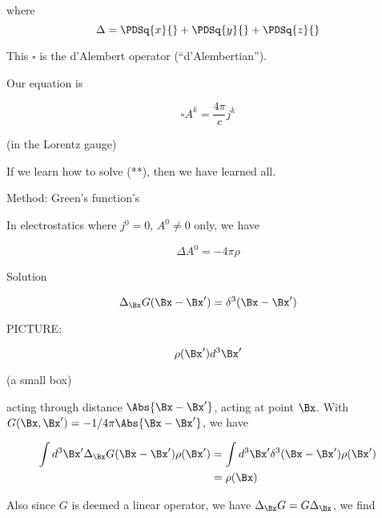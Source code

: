 where
\begin{equation}\label{eqn:relativisticElectrodynamicsL17b:291}
\Delta = \PDSq{x}{} + \PDSq{y}{} + \PDSq{z}{}
\end{equation}

This \(\square\) is the d'Alembert operator (``d'Alembertian'').

Our equation is 

\begin{equation}\label{eqn:relativisticElectrodynamicsL17b:310}
\square A^k = \frac{4 \pi}{c} j^k
\end{equation}

(in the Lorentz gauge)

If we learn how to solve (**), then we have learned all.

Method: Green's function's

In electrostatics where \(j^0 = 0\), \(A^0 \ne 0\) only, we have

\begin{equation}\label{eqn:relativisticElectrodynamicsL17b:330}
\Delta A^0 = -4 \pi \rho
\end{equation}

Solution 

\begin{equation}\label{eqn:relativisticElectrodynamicsL17b:350}
\Delta_{\Bx} G(\Bx - \Bx') = \delta^3( \Bx - \Bx')
\end{equation}

PICTURE: 

\begin{equation}\label{eqn:relativisticElectrodynamicsL17b:370}
\rho(\Bx') d^3 \Bx'
\end{equation}

(a small box)

acting through distance \(\Abs{\Bx - \Bx'}\), acting at point \(\Bx\).  With \(G(\Bx, \Bx') = -1/4 \pi\Abs{\Bx - \Bx'}\), we have

\begin{equation}\label{eqn:relativisticElectrodynamicsL17b:410}
\begin{aligned}
\int d^3 \Bx' \Delta_{\Bx} G(\Bx - \Bx') \rho(\Bx') 
&= \int d^3 \Bx' \delta^3( \Bx - \Bx') \rho(\Bx') \\
&= \rho(\Bx)
\end{aligned}
\end{equation}

Also since \(G\) is deemed a linear operator, we have \(\Delta_\Bx G = G \Delta_\Bx\), we find

